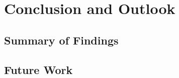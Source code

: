 \chapter{Conclusion and Outlook}\label{sec:conclusion}

\section{Summary of Findings}
\label{sec:conclusion:summary}


\section{Future Work}
\label{sec:conclusion:future-work}

